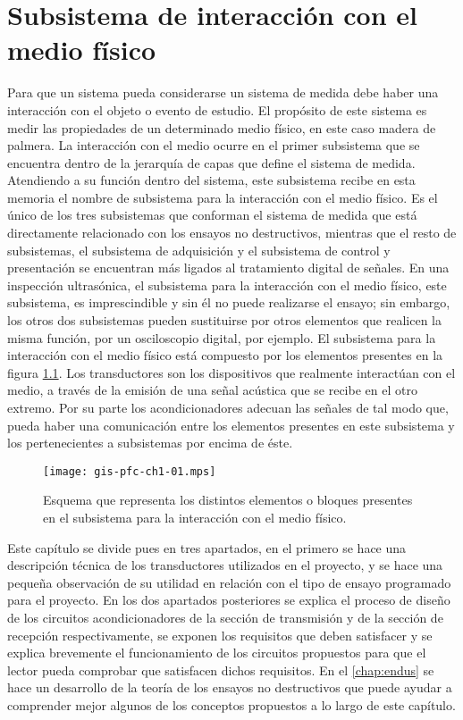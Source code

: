\chapter{Subsistema de interacción con el medio físico}

Para que un sistema pueda considerarse un sistema de medida debe haber una
interacción con el objeto o evento de estudio. El propósito de este sistema
es medir las propiedades de un determinado medio físico, en este caso
madera de palmera. La interacción con el medio ocurre en el primer
subsistema que se encuentra dentro de la jerarquía de capas que define el
sistema de medida. Atendiendo a su función dentro del sistema, este
subsistema recibe en esta memoria el nombre de subsistema para la
interacción con el medio físico. Es el único de los tres subsistemas que
conforman el sistema de medida que está directamente relacionado con los
ensayos no destructivos, mientras que el resto de subsistemas, el
subsistema de adquisición y el subsistema de control y presentación se
encuentran más ligados al tratamiento digital de señales. En una inspección
ultrasónica, el subsistema para la interacción con el medio físico, este
subsistema, es imprescindible y sin él no puede realizarse el ensayo; sin
embargo, los otros dos subsistemas pueden sustituirse por otros elementos
que realicen la misma función, por un osciloscopio digital, por ejemplo. El
subsistema para la interacción con el medio físico está compuesto por los
elementos presentes en la figura \cref{fig:submedium}. Los transductores
son los dispositivos que realmente interactúan con el medio, a través de la
emisión de una señal acústica que se recibe en el otro extremo. Por su
parte los acondicionadores adecuan las señales de tal modo que, pueda haber
una comunicación entre los elementos presentes en este subsistema y los
pertenecientes a subsistemas por encima de éste.

\begin{figure}
	\begin{center}
		\texttt{[image: gis-pfc-ch1-01.mps]}
	\end{center}
	\caption[Subsistema para la interacción del medio físico]{Esquema
	que representa los distintos elementos o bloques presentes en el
	subsistema para la interacción con el medio físico.}
	\label{fig:submedium}
\end{figure}

Este capítulo se divide pues en tres apartados, en el primero se hace una
descripción técnica de los transductores utilizados en el proyecto, y se
hace una pequeña observación de su utilidad en relación con el tipo de
ensayo programado para el proyecto. En los dos apartados posteriores se
explica el proceso de diseño de los circuitos acondicionadores de la
sección de transmisión y de la sección de recepción respectivamente, se
exponen los requisitos que deben satisfacer y se explica brevemente el
funcionamiento de los circuitos propuestos para que el lector pueda
comprobar que satisfacen dichos requisitos. En el \cref{chap:endus} se hace
un desarrollo de la teoría de los ensayos no destructivos que puede ayudar
a comprender mejor algunos de los conceptos propuestos a lo largo de este
capítulo.


